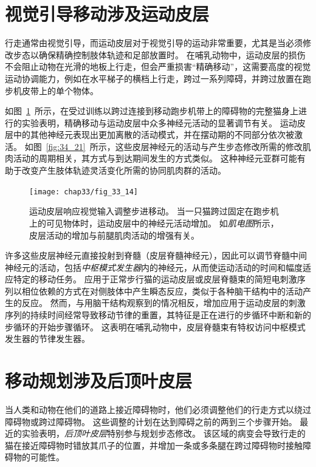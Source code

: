\section{视觉引导移动涉及运动皮层}

行走通常由视觉引导，而运动皮层对于视觉引导的运动非常重要，尤其是当必须修改步态以确保精确控制肢体轨迹和足部放置时。
在哺乳动物中，运动皮层的损伤不会阻止动物在光滑的地板上行走，但会严重损害“精确移动”，这需要高度的视觉运动协调能力，例如在水平梯子的横档上行走，跨过一系列障碍，并跨过放置在跑步机皮带上的单个物体。


如图~\ref{fig:33_14}~所示，在受过训练以跨过连接到移动跑步机带上的障碍物的完整猫身上进行的实验表明，精确移动与运动皮层中众多神经元活动的显著调节有关。
运动皮层中的其他神经元表现出更加离散的活动模式，并在摆动期的不同部分依次被激活。
如图~\ref{fig:34_21}~所示，这些皮层神经元的活动与产生步态修改所需的修改肌肉活动的周期相关，其方式与到达期间发生的方式类似。
这种神经元亚群可能有助于改变产生肢体轨迹灵活变化所需的协同肌肉群的活动。


\begin{figure}[htbp]
	\centering
	\texttt{[image: chap33/fig\_33\_14]}
	\caption{运动皮层响应视觉输入调整步进移动。
		当一只猫跨过固定在跑步机上的可见物体时，运动皮层中的神经元活动增加。
		如\textit{肌电图}所示，皮层活动的增加与前腿肌肉活动的增强有关\cite{drew1988motor}。}
	\label{fig:33_14}
\end{figure}


许多这些皮层神经元直接投射到脊髓（皮层脊髓神经元），因此可以调节脊髓中间神经元的活动，包括\textit{中枢模式发生器}内的神经元，从而使运动活动的时间和幅度适应特定的移动任务。
应用于正常步行猫的运动皮层或皮层脊髓束的简短电刺激序列以相位依赖的方式在对侧肢体中产生瞬态反应，类似于各种脑干结构中的活动产生的反应。
然而，与用脑干结构观察到的情况相反，增加应用于运动皮层的刺激序列的持续时间经常导致移动节律的重置，其特征是正在进行的步循环中断和新的步循环的开始步骤循环。
这表明在哺乳动物中，皮层脊髓束有特权访问中枢模式发生器的节律发生器。



\section{移动规划涉及后顶叶皮层}

当人类和动物在他们的道路上接近障碍物时，他们必须调整他们的行走方式以绕过障碍物或跨过障碍物。
这些调整的计划在达到障碍之前的两到三个步骤开始。
最近的实验表明，\textit{后顶叶皮层}特别参与规划步态修改。
该区域的病变会导致行走的猫在接近障碍物时错放其爪子的位置，并增加一条或多条腿在跨过障碍物时接触障碍物的可能性。


